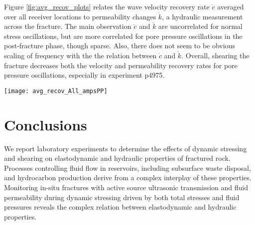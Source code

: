 \documentclass[draft]{agujournal2019}
\begin{document}
Figure \ref{fig:avg_recov_plots} relates the wave velocity recovery rate $ \dot c $ averaged over all receiver locations to permeability changes $ \dot k $, a hydraulic measurement across the fracture. The main observation $ \dot c $ and $ \dot k $ are uncorrelated for normal stress oscillations, but are more correlated for pore pressure oscillations in the post-fracture phase, though sparse. Also, there does not seem to be obvious scaling of frequency with the the relation between 
$ \dot c $ and $ \dot k $. Overall, shearing the fracture decreases both the velocity and permeability recovery rates for pore pressure oscillations, especially in experiment p4975. 

\begin{figure*}[ht]
	\centering
	\texttt{[image: avg\_recov\_All\_ampsPP]}
	\caption{Wave velocity recovery rate $ \dot c $ as a function of permeability recovery rate $ \dot k$ for $ P_P $ oscillations averaged over all receivers. Data symbol shapes correspond to the oscillation frequencies and their sizes to amplitude. In post-fracture oscillation sets, both high frequency and large amplitude oscillations yield faster recovery rates for both velocity and permeability. The predominant effect of shearing is a significant reduction in $ \dot k $ for $ \sigma_{NS} $ oscillations, but increase for  $ P_P $ oscillations.}
	\label{fig:avg_recov_plots}
\end{figure*}



\section{Conclusions}

We report laboratory experiments to determine the effects of dynamic stressing and shearing on elastodynamic and hydraulic properties of fractured rock. Processes controlling fluid flow in reservoirs, including subsurface waste disposal, and hydrocarbon production derive from a complex interplay of these properties. Monitoring in-situ fractures with active source ultrasonic transmission and fluid permeability during dynamic stressing driven by both total stresses and fluid pressures reveals the complex relation between elastodynamic and hydraulic properties. 
\end{document}
